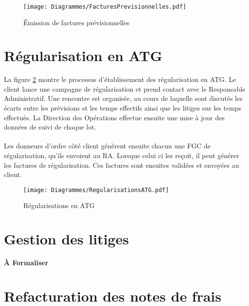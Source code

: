 \begin{figure}
	\centering
		\texttt{[image: Diagrammes/FacturesPrevisionnelles.pdf]}
	\caption{Émission de factures prévisionnelles}
	\label{previsionnelATG}	
\end{figure}


\section{Régularisation en ATG}

\paragraph{} La figure \ref{regulATG} montre le processus d'établissement des régularisation en ATG. Le client lance une campagne de régularisation et prend contact avec le Responsable Administratif. Une rencontre est organisée, au cours de laquelle sont discutés les écarts entre les prévisions et les temps effectifs ainsi que les litiges sur les temps effectués. La Direction des Opérations effectue ensuite une mise à jour des données de suivi de chaque lot.
\paragraph{} Les donneurs d'ordre côté client génèrent ensuite chacun une FGC de régularisation, qu'ils envoient au RA. Lorsque celui ci les reçoit, il peut générer les factures de régularisation. Ces factures sont ensuites validées et envoyées au client.


\begin{figure}
	\centering
		\texttt{[image: Diagrammes/RegularisationsATG.pdf]}
	\caption{Régularisations en ATG}
	\label{regulATG}	
\end{figure}	



\section{Gestion des litiges}
\paragraph{À Formaliser}


\section{Refacturation des notes de frais}
